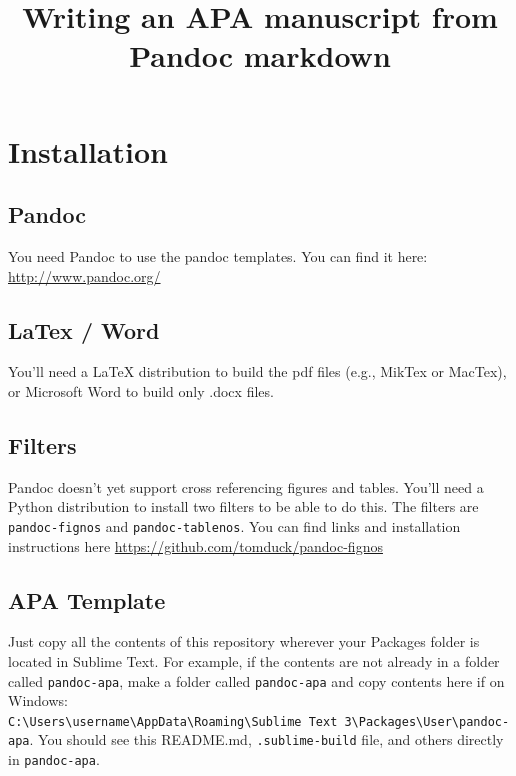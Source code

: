 \documentclass[doc,longtable]{apa6}
\title{Writing an APA manuscript from Pandoc markdown}
\begin{document}
\maketitle

\section{Installation}\label{installation}

\subsection{Pandoc}\label{pandoc}

You need Pandoc to use the pandoc templates. You can find it here: \url{http://www.pandoc.org/}

\subsection{LaTex / Word}\label{latex-word}

You'll need a LaTeX distribution to build the pdf files (e.g., MikTex or MacTex), or Microsoft Word to build only .docx files.

\subsection{Filters}\label{filters}

Pandoc doesn't yet support cross referencing figures and tables. You'll need a Python distribution to install two filters to be able to do this. The filters are \texttt{pandoc-fignos} and \texttt{pandoc-tablenos}. You can find links and installation instructions here \url{https://github.com/tomduck/pandoc-fignos}

\subsection{APA Template}\label{apa-template}

Just copy all the contents of this repository wherever your Packages folder is located in Sublime Text. For example, if the contents are not already in a folder called \texttt{pandoc-apa}, make a folder called \texttt{pandoc-apa} and copy contents here if on Windows: \texttt{C:\textbackslash{}Users\textbackslash{}username\textbackslash{}AppData\textbackslash{}Roaming\textbackslash{}Sublime\ Text\ 3\textbackslash{}Packages\textbackslash{}User\textbackslash{}pandoc-apa}. You should see this README.md, \texttt{.sublime-build} file, and others directly in \texttt{pandoc-apa}.
\end{document}
